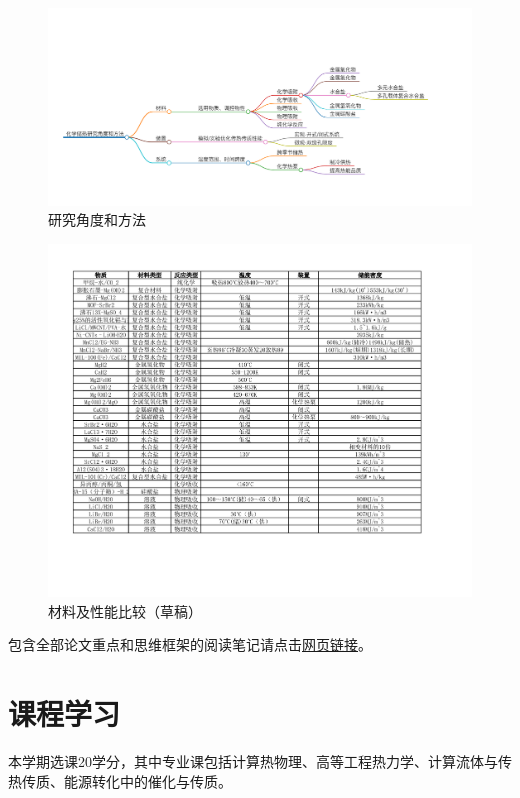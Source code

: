 \documentclass[oneside]{report}
\begin{document}
\begin{figure}[H]
    \centering
    \includegraphics[width=\textwidth]{image/CHS研究角度和方法.pdf}
    \caption{研究角度和方法}
    \label{fig:研究角度}
\end{figure}
\begin{figure}[H]
    \centering
    \includegraphics[width=\textwidth]{image/性能比较.pdf}
    \caption{材料及性能比较（草稿）}
    \label{fig:材料对比}
\end{figure}

包含全部论文重点和思维框架的阅读笔记请点击\href{https://github.com/LamGaahou/CHS/blob/main/reports/image/Markmap.pdf}{\color{blue}网页链接}。


\section*{课程学习}

本学期选课20学分，其中专业课包括计算热物理、高等工程热力学、计算流体与传热传质、能源转化中的催化与传质。
\end{document}
